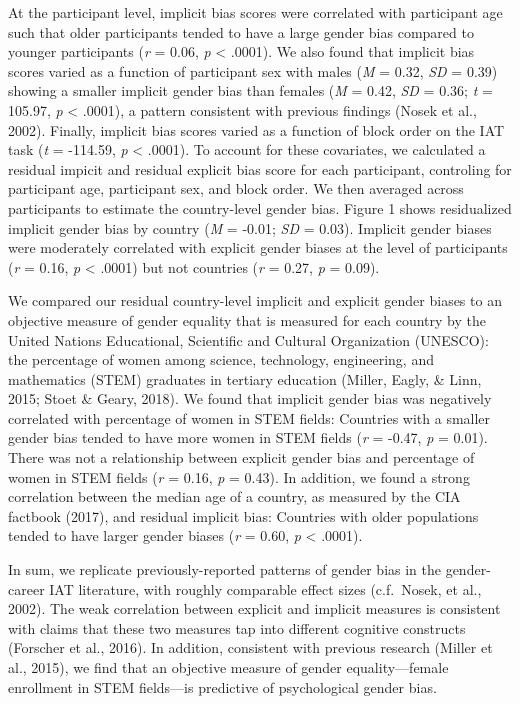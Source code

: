 \documentclass[man,floatsintext]{apa6}
\theoremstyle{definition}
\theoremstyle{definition}
\theoremstyle{definition}
\theoremstyle{remark}
\begin{document}
At the participant level, implicit bias scores were correlated with
participant age such that older participants tended to have a large
gender bias compared to younger participants (\emph{r} = 0.06, \emph{p}
\textless{} .0001). We also found that implicit bias scores varied as a
function of participant sex with males (\emph{M} = 0.32, \emph{SD} =
0.39) showing a smaller implicit gender bias than females (\emph{M} =
0.42, \emph{SD} = 0.36; \emph{t} = 105.97, \emph{p} \textless{} .0001),
a pattern consistent with previous findings (Nosek et al., 2002).
Finally, implicit bias scores varied as a function of block order on the
IAT task (\emph{t} = -114.59, \emph{p} \textless{} .0001). To account
for these covariates, we calculated a residual impicit and residual
explicit bias score for each participant, controling for participant
age, participant sex, and block order. We then averaged across
participants to estimate the country-level gender bias. Figure 1 shows
residualized implicit gender bias by country (\emph{M} = -0.01;
\emph{SD} = 0.03). Implicit gender biases were moderately correlated
with explicit gender biases at the level of participants (\emph{r} =
0.16, \emph{p} \textless{} .0001) but not countries (\emph{r} = 0.27,
\emph{p} = 0.09).

We compared our residual country-level implicit and explicit gender
biases to an objective measure of gender equality that is measured for
each country by the United Nations Educational, Scientific and Cultural
Organization (UNESCO): the percentage of women among science,
technology, engineering, and mathematics (STEM) graduates in tertiary
education (Miller, Eagly, \& Linn, 2015; Stoet \& Geary, 2018). We found
that implicit gender bias was negatively correlated with percentage of
women in STEM fields: Countries with a smaller gender bias tended to
have more women in STEM fields (\emph{r} = -0.47, \emph{p} = 0.01).
There was not a relationship between explicit gender bias and percentage
of women in STEM fields (\emph{r} = 0.16, \emph{p} = 0.43). In addition,
we found a strong correlation between the median age of a country, as
measured by the CIA factbook (2017), and residual implicit bias:
Countries with older populations tended to have larger gender biases
(\emph{r} = 0.60, \emph{p} \textless{} .0001).

In sum, we replicate previously-reported patterns of gender bias in the
gender-career IAT literature, with roughly comparable effect sizes
(c.f.~Nosek, et al., 2002). The weak correlation between explicit and
implicit measures is consistent with claims that these two measures tap
into different cognitive constructs (Forscher et al., 2016). In
addition, consistent with previous research (Miller et al., 2015), we
find that an objective measure of gender equality---female enrollment in
STEM fields---is predictive of psychological gender bias.
\end{document}
